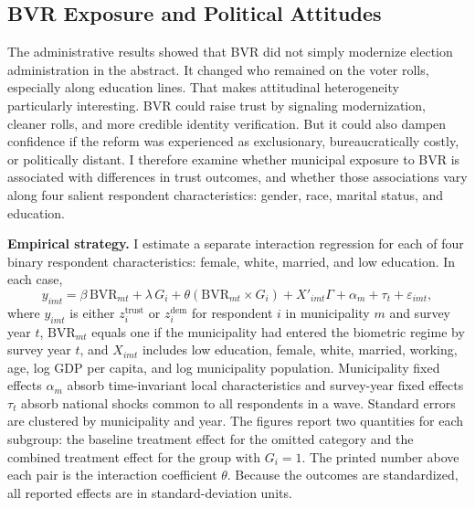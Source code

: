 \subsection{BVR Exposure and Political Attitudes}

The administrative results showed that BVR did not simply modernize election administration in the abstract. It changed who remained on the voter rolls, especially along education lines. That makes attitudinal heterogeneity particularly interesting. BVR could raise trust by signaling modernization, cleaner rolls, and more credible identity verification. But it could also dampen confidence if the reform was experienced as exclusionary, bureaucratically costly, or politically distant. I therefore examine whether municipal exposure to BVR is associated with differences in trust outcomes, and whether those associations vary along four salient respondent characteristics: gender, race, marital status, and education.

\textbf{Empirical strategy.} I estimate a separate interaction regression for each of four binary respondent characteristics: female, white, married, and low education. In each case,
\begin{equation}
\label{eq:lapop-trust}
y_{imt} = \beta\,\text{BVR}_{mt} + \lambda\,G_i + \theta\left(\text{BVR}_{mt}\times G_i\right) + X'_{imt}\Gamma + \alpha_m + \tau_t + \varepsilon_{imt},
\end{equation}
where $y_{imt}$ is either $z_i^{\text{trust}}$ or $z_i^{\text{dem}}$ for respondent $i$ in municipality $m$ and survey year $t$, $\text{BVR}_{mt}$ equals one if the municipality had entered the biometric regime by survey year $t$, and $X_{imt}$ includes low education, female, white, married, working, age, log GDP per capita, and log municipality population. Municipality fixed effects $\alpha_m$ absorb time-invariant local characteristics and survey-year fixed effects $\tau_t$ absorb national shocks common to all respondents in a wave. Standard errors are clustered by municipality and year. The figures report two quantities for each subgroup: the baseline treatment effect for the omitted category and the combined treatment effect for the group with $G_i = 1$. The printed number above each pair is the interaction coefficient $\theta$. Because the outcomes are standardized, all reported effects are in standard-deviation units.

